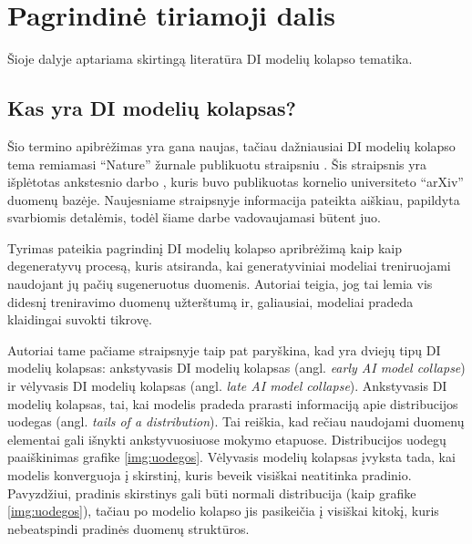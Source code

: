\documentclass{VUMIFInfKursinis}
\begin{document}




\section{Pagrindinė tiriamoji dalis}

Šioje dalyje aptariama skirtingą literatūra DI modelių kolapso tematika. 

\subsection{Kas yra DI modelių kolapsas?}
Šio termino apibrėžimas yra gana naujas, tačiau dažniausiai DI modelių kolapso tema remiamasi \enquote{Nature} žurnale publikuotu straipsniu \cite{AICollapseNature}. Šis straipsnis yra išplėtotas ankstesnio darbo \cite{CurseOfRecursion}, kuris buvo publikuotas kornelio universiteto \enquote{arXiv} duomenų bazėje. Naujesniame straipsnyje informacija pateikta aiškiau, papildyta svarbiomis detalėmis, todėl šiame darbe vadovaujamasi būtent juo.

Tyrimas \cite{AICollapseNature} pateikia pagrindinį DI modelių kolapso apribrėžimą kaip kaip degeneratyvų procesą, kuris atsiranda, kai generatyviniai modeliai treniruojami naudojant jų pačių sugeneruotus duomenis. Autoriai teigia, jog tai lemia vis didesnį treniravimo duomenų užterštumą ir, galiausiai, modeliai pradeda klaidingai suvokti tikrovę.

Autoriai tame pačiame straipsnyje taip pat paryškina, kad yra dviejų tipų DI modelių kolapsas: ankstyvasis DI modelių kolapsas (angl. \textsl{early AI model collapse}) ir vėlyvasis DI modelių kolapsas (angl. \textsl{late AI model collapse}). Ankstyvasis DI modelių kolapsas, tai, kai modelis pradeda prarasti informaciją apie distribucijos uodegas (angl. \textsl{tails of a distribution}). Tai reiškia, kad rečiau naudojami duomenų elementai gali išnykti ankstyvuosiuose mokymo etapuose. Distribucijos uodegų paaiškinimas grafike \ref{img:uodegos}. Vėlyvasis modelių kolapsas įvyksta tada, kai modelis konverguoja į skirstinį, kuris beveik visiškai neatitinka pradinio. Pavyzdžiui, pradinis skirstinys gali būti normali distribucija (kaip grafike \ref{img:uodegos}), tačiau po modelio kolapso jis pasikeičia į visiškai kitokį, kuris nebeatspindi pradinės duomenų struktūros.
\end{document}
